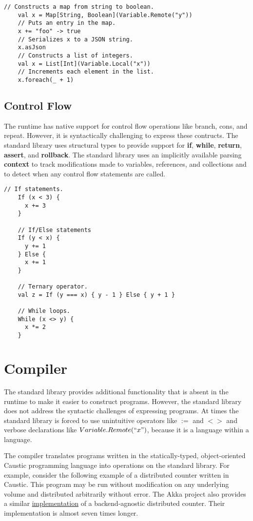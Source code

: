 \documentclass[../main.tex]{subfiles}
\begin{document}
  \begin{lstlisting}[style=Scala]
    // Constructs a map from string to boolean.
    val x = Map[String, Boolean](Variable.Remote("y"))
    // Puts an entry in the map.
    x += "foo" -> true
    // Serializes x to a JSON string.
    x.asJson
    // Constructs a list of integers.
    val x = List[Int](Variable.Local("x"))
    // Increments each element in the list.
    x.foreach(_ + 1)
  \end{lstlisting}

  \subsection{Control Flow}
  The runtime has native support for control flow operations like branch, cons, and repeat.
  However, it is syntactically challenging to express these contructs. The standard library
  uses structural types to provide support for \textbf{if}, \textbf{while}, \textbf{return},
  \textbf{assert}, and \textbf{rollback}. The standard library uses an implicitly available parsing
  \textbf{context} to track modifications made to variables, references, and collections and to
  detect when any control flow statements are called.

  \begin{lstlisting}[style=Scala]
    // If statements.
    If (x < 3) {
      x += 3
    }

    // If/Else statements
    If (y < x) {
      y += 1
    } Else {
      x += 1
    }

    // Ternary operator.
    val z = If (y === x) { y - 1 } Else { y + 1 }

    // While loops.
    While (x <> y) {
      x *= 2
    }
  \end{lstlisting}

\section{Compiler}
The standard library provides additional functionality that is absent in the runtime to make it
easier to construct programs. However, the standard library does not address the syntactic
challenges of expressing programs. At times the standard library is forced to use unintuitive
operators like $:=$ and $<>$ and verbose declarations like $Variable.Remote(``x")$, because it is a
language within a language.

The compiler translates programs written in the statically-typed, object-oriented Caustic
programming language into operations on the standard library. For example, consider the following
example of a distributed counter written in Caustic. This program may be run without modification
on any underlying volume and distributed arbitrarily without error. The Akka project also provides
a similar \href{https://git.io/vxS6u}{implementation} of a backend-agnostic distributed counter.
Their implementation is almost seven times longer.
\end{document}
